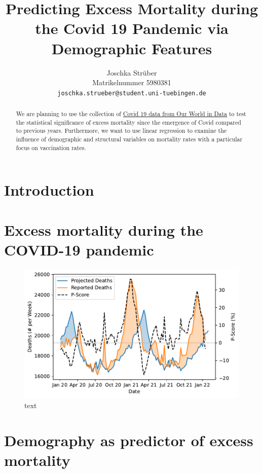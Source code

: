 \documentclass{article}
\title{Predicting Excess Mortality during the Covid 19 Pandemic via Demographic Features}
\author{%
  Joschka Strüber\\
  Matrikelnummer 5980381\\
  \texttt{joschka.strueber@student.uni-tuebingen.de}
}
\begin{document}
\maketitle

\begin{abstract}
  We are planning to use the collection of \href{https://github.com/owid/covid-19-data}{Covid 19 data from Our World in Data} to test the statistical significance of excess mortality since the emergence of Covid compared to previous years. Furthermore, we want to use linear regression to examine the influence of demographic and structural variables on mortality rates with a particular focus on vaccination rates.
\end{abstract}

\section{Introduction}

\lipsum[1]

\section{Excess mortality during the COVID-19 pandemic}

\lipsum[2]
\lipsum[3]

\begin{figure}[t]
	\centering
	\includegraphics[width=0.8\linewidth]{fig/fig_em_intro}
	\caption[Blub]{text}
\end{figure}

\lipsum[2]

\lipsum[3]

\section{Demography as predictor of excess mortality}
\end{document}
